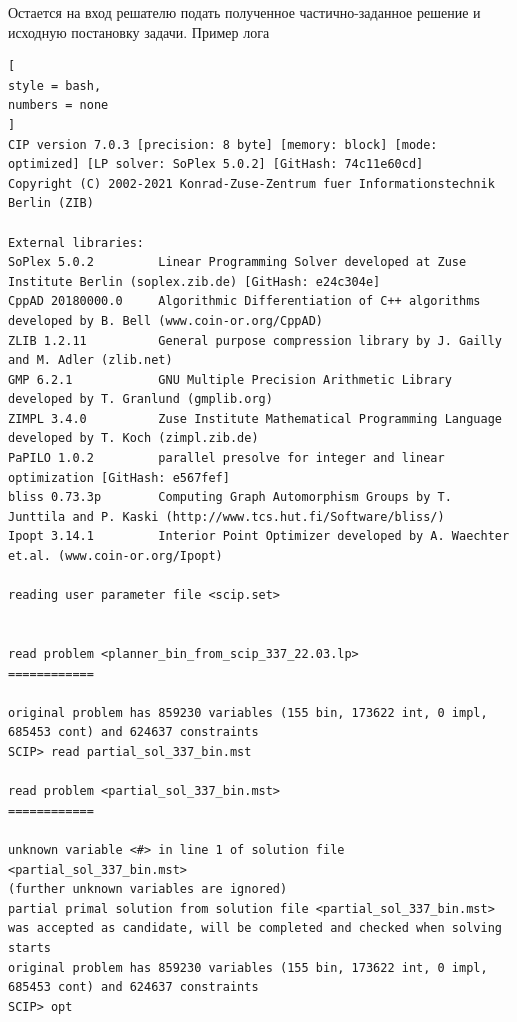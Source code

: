 \documentclass[%
	11pt,
	a4paper,
	utf8,
		]{article}
\begin{document}
Остается на вход решателю подать полученное частично-заданное решение и исходную постановку задачи. Пример лога
\begin{lstlisting}[
style = bash,
numbers = none
]
CIP version 7.0.3 [precision: 8 byte] [memory: block] [mode: optimized] [LP solver: SoPlex 5.0.2] [GitHash: 74c11e60cd]
Copyright (C) 2002-2021 Konrad-Zuse-Zentrum fuer Informationstechnik Berlin (ZIB)

External libraries: 
SoPlex 5.0.2         Linear Programming Solver developed at Zuse Institute Berlin (soplex.zib.de) [GitHash: e24c304e]
CppAD 20180000.0     Algorithmic Differentiation of C++ algorithms developed by B. Bell (www.coin-or.org/CppAD)
ZLIB 1.2.11          General purpose compression library by J. Gailly and M. Adler (zlib.net)
GMP 6.2.1            GNU Multiple Precision Arithmetic Library developed by T. Granlund (gmplib.org)
ZIMPL 3.4.0          Zuse Institute Mathematical Programming Language developed by T. Koch (zimpl.zib.de)
PaPILO 1.0.2         parallel presolve for integer and linear optimization [GitHash: e567fef]
bliss 0.73.3p        Computing Graph Automorphism Groups by T. Junttila and P. Kaski (http://www.tcs.hut.fi/Software/bliss/)
Ipopt 3.14.1         Interior Point Optimizer developed by A. Waechter et.al. (www.coin-or.org/Ipopt)

reading user parameter file <scip.set>


read problem <planner_bin_from_scip_337_22.03.lp>
============

original problem has 859230 variables (155 bin, 173622 int, 0 impl, 685453 cont) and 624637 constraints
SCIP> read partial_sol_337_bin.mst

read problem <partial_sol_337_bin.mst>
============

unknown variable <#> in line 1 of solution file <partial_sol_337_bin.mst>
(further unknown variables are ignored)
partial primal solution from solution file <partial_sol_337_bin.mst> was accepted as candidate, will be completed and checked when solving starts
original problem has 859230 variables (155 bin, 173622 int, 0 impl, 685453 cont) and 624637 constraints
SCIP> opt


\end{lstlisting}
\end{document}
